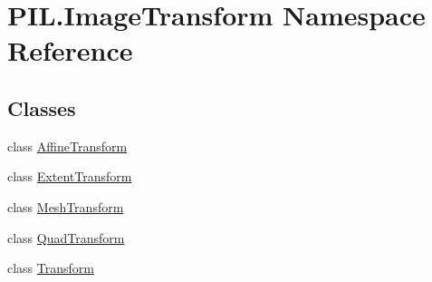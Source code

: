 \hypertarget{namespacePIL_1_1ImageTransform}{}\section{P\+I\+L.\+Image\+Transform Namespace Reference}
\label{namespacePIL_1_1ImageTransform}
\subsection*{Classes}
\begin{DoxyCompactItemize}
\item 
class \hyperlink{classPIL_1_1ImageTransform_1_1AffineTransform}{Affine\+Transform}
\item 
class \hyperlink{classPIL_1_1ImageTransform_1_1ExtentTransform}{Extent\+Transform}
\item 
class \hyperlink{classPIL_1_1ImageTransform_1_1MeshTransform}{Mesh\+Transform}
\item 
class \hyperlink{classPIL_1_1ImageTransform_1_1QuadTransform}{Quad\+Transform}
\item 
class \hyperlink{classPIL_1_1ImageTransform_1_1Transform}{Transform}
\end{DoxyCompactItemize}
